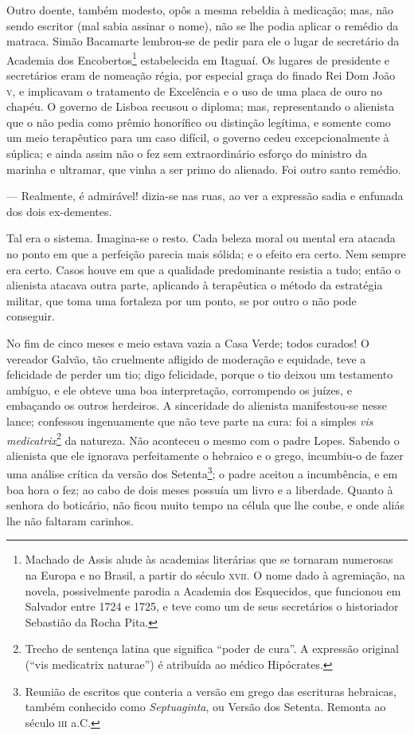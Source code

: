 Outro doente, também modesto, opôs a mesma rebeldia à medicação; mas,
não sendo escritor (mal sabia assinar o nome), não se lhe podia aplicar
o remédio da matraca. Simão Bacamarte lembrou-se de pedir para ele o
lugar de secretário da Academia dos Encobertos\footnote{Machado de Assis
  alude às academias literárias que se tornaram numerosas na Europa e no
  Brasil, a partir do século \textsc{xvii}. O nome dado à agremiação, na novela,
  possivelmente parodia a Academia dos Esquecidos, que funcionou em
  Salvador entre 1724 e 1725, e teve como um de seus secretários o
  historiador Sebastião da Rocha Pita.} estabelecida em Itaguaí. Os
lugares de presidente e secretários eram de nomeação régia, por especial
graça do finado Rei Dom João \textsc{v}, e implicavam o tratamento de Excelência
e o uso de uma placa de ouro no chapéu. O governo de Lisboa recusou o
diploma; mas, representando o alienista que o não pedia como prêmio
honorífico ou distinção legítima, e somente como um meio terapêutico
para um caso difícil, o governo cedeu excepcionalmente à súplica; e
ainda assim não o fez sem extraordinário esforço do ministro da marinha
e ultramar, que vinha a ser primo do alienado. Foi outro santo remédio.

--- Realmente, é admirável! dizia-se nas ruas, ao ver a expressão sadia
e enfunada dos dois ex-dementes.

Tal era o sistema. Imagina-se o resto. Cada beleza moral ou mental era
atacada no ponto em que a perfeição parecia mais sólida; e o efeito era
certo. Nem sempre era certo. Casos houve em que a qualidade predominante
resistia a tudo; então o alienista atacava outra parte, aplicando à
terapêutica o método da estratégia militar, que toma uma fortaleza por
um ponto, se por outro o não pode conseguir.

No fim de cinco meses e meio estava vazia a Casa Verde; todos curados! O
vereador Galvão, tão cruelmente afligido de moderação e equidade, teve a
felicidade de perder um tio; digo felicidade, porque o tio deixou um
testamento ambíguo, e ele obteve uma boa interpretação, corrompendo os
juízes, e embaçando os outros herdeiros. A sinceridade do alienista
manifestou-se nesse lance; confessou ingenuamente que não teve parte na
cura: foi a simples \emph{vis medicatrix}\footnote{Trecho de sentença
  latina que significa ``poder de cura''. A expressão original (``vis
  medicatrix naturae'') é atribuída ao médico Hipócrates.} da natureza.
Não aconteceu o mesmo com o padre Lopes. Sabendo o alienista que ele
ignorava perfeitamente o hebraico e o grego, incumbiu-o de fazer uma
análise crítica da versão dos Setenta\footnote{Reunião de escritos que
  conteria a versão em grego das escrituras hebraicas, também conhecido
  como \emph{Septuaginta}, ou Versão dos Setenta. Remonta ao século \textsc{iii}
  a.C.}; o padre aceitou a incumbência, e em boa hora o fez; ao cabo de
dois meses possuía um livro e a liberdade. Quanto à senhora do
boticário, não ficou muito tempo na célula que lhe coube, e onde aliás
lhe não faltaram carinhos.

